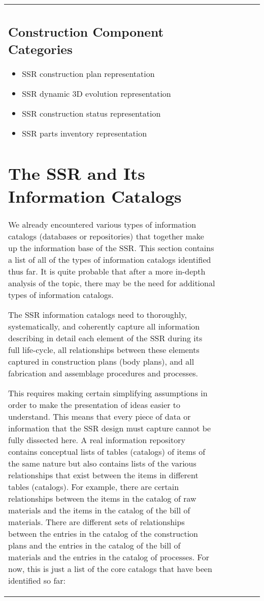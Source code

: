 \begin{table}[h]
\begin{center}
\begin{tabular}{| l l l l l l |}
\subsection{Construction Component Categories}
\begin{itemize}
\item SSR construction plan representation
\item SSR dynamic 3D evolution representation
\item SSR construction status representation
\item SSR parts inventory representation
\end{itemize}
\index{self-replication!design!components|)}

\section{The SSR and Its Information Catalogs}

\index{self-replication!design!information catalogs|(}
We already encountered various types of information catalogs (databases
or repositories) that together make up the information base of the SSR.
This section contains a list of all of the types of information catalogs
identified thus far. It is quite probable that after a more in-depth analysis of the topic, there may be the need for additional types of information catalogs.

The SSR information catalogs need to thoroughly, systematically, and coherently capture 
all information describing in detail each element of the SSR during its
full life-cycle, all relationships between these elements captured in
construction plans (body plans), and all fabrication and assemblage
procedures and processes.

This requires making certain simplifying assumptions in order to make the presentation of ideas easier to understand. This means that every piece of data or information that the SSR design must capture cannot be fully dissected here.
A real information repository contains
conceptual lists of tables (catalogs) of items of the same nature but
also contains lists of the various relationships that exist between the
items in different tables (catalogs).  For example, there are certain
relationships between the items in the catalog of raw materials and the
items in the catalog of the bill of materials. There are
different sets of relationships between the entries in the catalog of
the construction plans and the entries in the catalog of the bill of
materials and the entries in the catalog of processes.  For now, this
is just a list of the core catalogs that have been identified so far:


\end{tabular}
\end{center}
\end{table}
